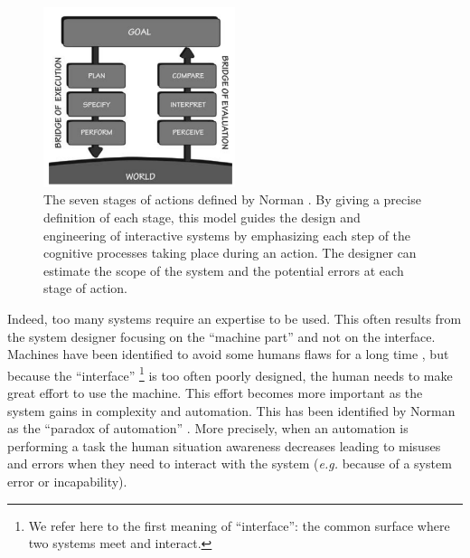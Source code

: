 \documentclass[a4paper,11pt,twoside]{StyleThese}
\begin{document}
\begin{figure}
\centering
\includegraphics[width=0.5\textwidth]{figures/chapter1/Norman_7_stages_action.png}
\caption{The seven stages of actions defined by Norman \cite{norman2013design}. By giving a precise definition of each stage, this model guides the design and engineering of interactive systems by emphasizing each step of the cognitive processes taking place during an action. The designer can estimate the scope of the system and the potential errors at each stage of action.}
\label{fig:norman_7_stages}
\end{figure}

Indeed, too many systems require an expertise to be used. This often results from the system designer focusing on the ``machine part'' and not on the interface. Machines have been identified to avoid some humans flaws for a long time \cite{fitts_human_1951}, but because the ``interface'' \footnote{We refer here to the first meaning of ``interface'': the common surface where two systems meet and interact.} is too often poorly designed, the human needs to make great effort to use the machine. This effort becomes more important as the system gains in complexity and automation. This has been identified by Norman as the ``paradox of automation'' \cite{norman2013design}. More precisely, when an automation is performing a task the human situation awareness \cite{endsley_design_1988} decreases leading to misuses and errors when they need to interact with the system (\textit{e.g.} because of a system error or incapability).
\end{document}

